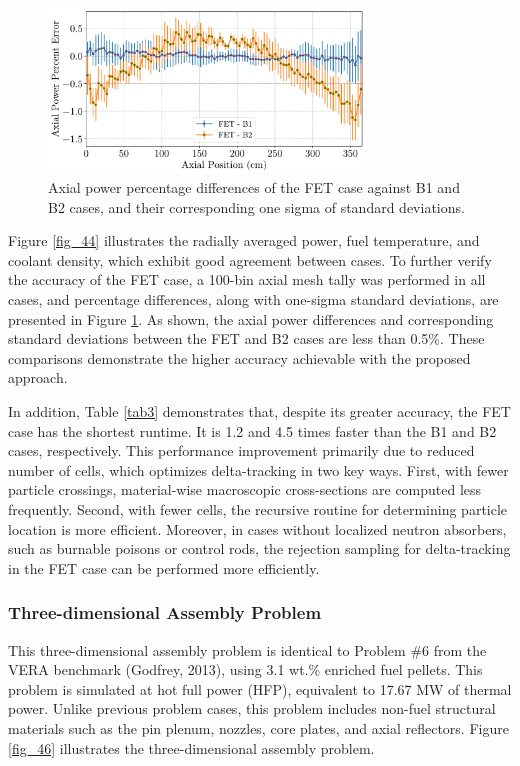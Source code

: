 \begin{figure}
    \centering
    \includegraphics[width=0.75\textwidth]{figs/axial_diff.pdf}
    \caption[Axial power percentage differences of the FET case]{Axial power percentage differences of the FET case against B1 and B2 cases, and their corresponding one sigma of standard deviations.}
    \label{fig_45}
\end{figure}

Figure \ref{fig_44} illustrates the radially averaged power, fuel temperature, and coolant density, which exhibit good agreement between cases. To further verify the accuracy of the FET case, a 100-bin axial mesh tally was performed in all cases, and percentage differences, along with one-sigma standard deviations, are presented in Figure \ref{fig_45}. As shown, the axial power differences and corresponding standard deviations between the FET and B2 cases are less than 0.5\%. These comparisons demonstrate the higher accuracy achievable with the proposed approach.

In addition, Table \ref{tab3} demonstrates that, despite its greater accuracy, the FET case has the shortest runtime. It is 1.2 and 4.5 times faster than the B1 and B2 cases, respectively. This performance improvement primarily due to reduced number of cells, which optimizes delta-tracking in two key ways. First, with fewer particle crossings, material-wise macroscopic cross-sections are computed less frequently. Second, with fewer cells, the recursive routine for determining particle location is more efficient. Moreover, in cases without localized neutron absorbers, such as burnable poisons or control rods, the rejection sampling for delta-tracking in the FET case can be performed more efficiently.

\subsubsection{Three-dimensional Assembly Problem} \label{3d_asm}

This three-dimensional assembly problem is identical to Problem \#6 from the VERA benchmark (Godfrey, 2013), using 3.1 wt.\% enriched fuel pellets. This problem is simulated at hot full power (HFP), equivalent to 17.67 MW of thermal power. Unlike previous problem cases, this problem includes non-fuel structural materials such as the pin plenum, nozzles, core plates, and axial reflectors. Figure \ref{fig_46} illustrates the three-dimensional assembly problem.

